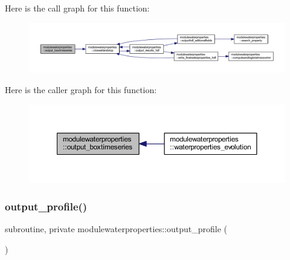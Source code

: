 Here is the call graph for this function\+:\nopagebreak
\begin{figure}[H]
\begin{center}
\leavevmode
\includegraphics[width=350pt]{namespacemodulewaterproperties_a8400d7aab12081d64e14b5947eb9734c_cgraph}
\end{center}
\end{figure}
Here is the caller graph for this function\+:\nopagebreak
\begin{figure}[H]
\begin{center}
\leavevmode
\includegraphics[width=350pt]{namespacemodulewaterproperties_a8400d7aab12081d64e14b5947eb9734c_icgraph}
\end{center}
\end{figure}
\mbox{\label{namespacemodulewaterproperties_adbe4280f2ebe3767932360d61563ff93}} 
\subsubsection{\texorpdfstring{output\+\_\+profile()}{output\_profile()}}
{\footnotesize\ttfamily subroutine, private modulewaterproperties\+::output\+\_\+profile (\begin{DoxyParamCaption}{ }\end{DoxyParamCaption})\hspace{0.3cm}{\ttfamily [private]}}

